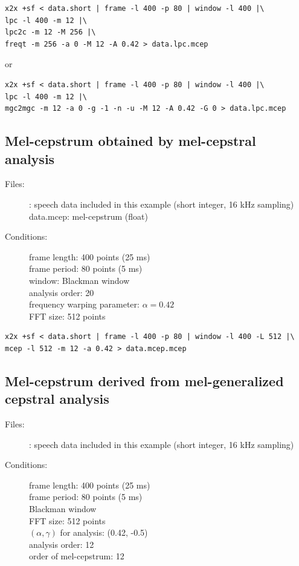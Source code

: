 \documentclass[a4paper,10pt]{article}
\begin{document}
\begin{verbatim}
x2x +sf < data.short | frame -l 400 -p 80 | window -l 400 |\
lpc -l 400 -m 12 |\
lpc2c -m 12 -M 256 |\
freqt -m 256 -a 0 -M 12 -A 0.42 > data.lpc.mcep
\end{verbatim}

or

\begin{verbatim}
x2x +sf < data.short | frame -l 400 -p 80 | window -l 400 |\
lpc -l 400 -m 12 |\
mgc2mgc -m 12 -a 0 -g -1 -n -u -M 12 -A 0.42 -G 0 > data.lpc.mcep
\end{verbatim}

\subsection{Mel-cepstrum obtained by mel-cepstral analysis}

\begin{description}
\item[Files:]
  : speech data included in this example (short integer, 16 kHz sampling)\\
  data.mcep: mel-cepstrum (float)
\item[Conditions:]
  frame length: 400 points (25 ms)\\
  frame period: 80 points (5 ms)\\
  window: Blackman window\\
  analysis order: 20 \\
  frequency warping parameter: $\alpha = 0.42$\\
  FFT size: 512 points
\end{description}

\begin{verbatim}
x2x +sf < data.short | frame -l 400 -p 80 | window -l 400 -L 512 |\
mcep -l 512 -m 12 -a 0.42 > data.mcep.mcep
\end{verbatim}

\subsection{Mel-cepstrum derived from mel-generalized cepstral analysis}

\begin{description}
\item[Files:]
  : speech data included in this example (short integer, 16 kHz sampling)\\
\item[Conditions:]
  frame length: 400 points (25 ms)\\
  frame period: 80 points (5 ms)\\
  Blackman window\\
  FFT size: 512 points\\
  $(\alpha, \gamma)$ for analysis: (0.42, -0.5)\\
  analysis order: 12\\
  order of mel-cepstrum: 12
\end{description}
\end{document}
